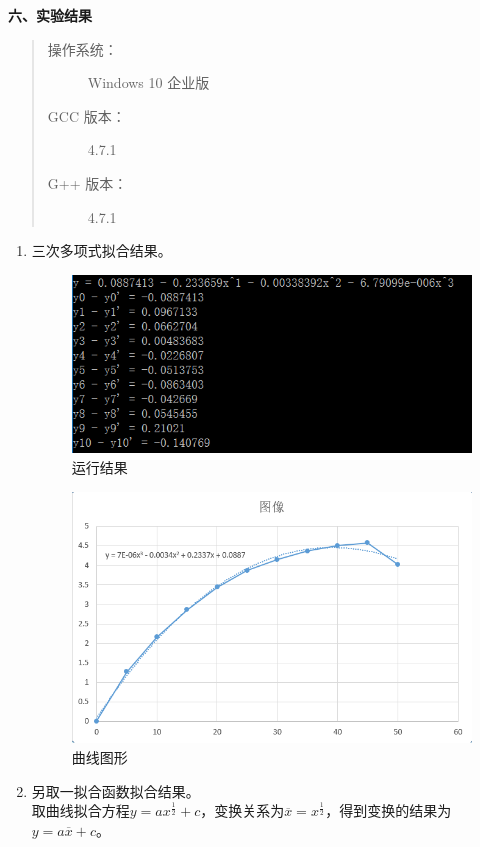 \documentclass[a4paper,11pt]{article}
\begin{document}
\begin{Large}
	\textbf{六、实验结果}
\end{Large}
\begin{quote}
	\begin{description}
		\item[操作系统：] Windows 10 企业版
		\item[GCC 版本：] 4.7.1
		\item[G++ 版本：] 4.7.1
	\end{description}
\end{quote}
\begin{enumerate}
	\item 三次多项式拟合结果。
	\begin{figure}[H]
		\centering
		\includegraphics[width=12cm]{picture/result1.png}
		\caption{运行结果}
	\end{figure}
	\begin{figure}[H]
		\centering
		\includegraphics[width=12cm]{picture/image1.png}
		\caption{曲线图形}
	\end{figure}
	\item 另取一拟合函数拟合结果。\\
	取曲线拟合方程$y=ax^{\frac{1}{2}}+c$，变换关系为$\overline{x}=x^{\frac{1}{2}}$，得到变换的结果为$y=a\overline{x}+c$。\\

\end{enumerate}
\end{document}
